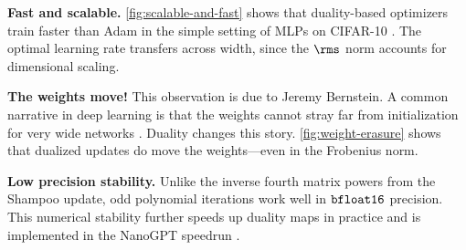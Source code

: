 \textbf{Fast and scalable.} \cref{fig:scalable-and-fast} shows that duality-based optimizers train faster than Adam in the simple setting of MLPs on CIFAR-10 \citep{krizhevsky2009cifar}. The optimal learning rate transfers across width, since the $\rms$ norm accounts for dimensional scaling.

\textbf{The weights move!} This observation is due to Jeremy Bernstein. A common narrative in deep learning is that the weights cannot stray far from initialization for very wide networks \citep{NEURIPS2019_0d1a9651,math9182246}. Duality changes this story. \cref{fig:weight-erasure} shows that dualized updates do move the weights---even in the Frobenius norm.

\textbf{Low precision stability.} Unlike the inverse fourth matrix powers from the Shampoo update, odd polynomial iterations work well in $\verb|bfloat16|$ precision. This numerical stability further speeds up duality maps in practice and is implemented in the NanoGPT speedrun \citep{modded_nanogpt_2024}.

\vspace{1em}

